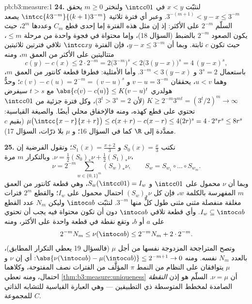 \begin{solution}{pb:b3:measure:1}
\textbf{24.} لنثبّت $x < y$ في $\intcc01$ ولنختر $m \geq 0$
يحقق $3^{-(m+1)} < y - x \leq 3^{-m}$. وعبر أي فترة ثلاثية $\intcc{k3^{-m}}{(k+1)3^{-m}}$ يصعد السلّم $2^{-m}$
على الأكثر: إذ إن مثل هذه الفترة إما إحدى قطع $C_m$ وعددها
$2^m$، حيث يكون الصعود $2^{-m}$ بالضبط (السؤال 18)، وإما محتواة
في  فجوة واحدة من مرحلة $\leq m$، حيث تكون $c$ ثابتة. وبما
أن $y - x \leq
3^{-m}$، فإن الفترة $\intcc xy$ تلاقي فترتين ثلاثيتين
متتاليتين على الأكثر من العمق $m$، ومنه
\[
c(y) - c(x) \leq 2\cdot2^{-m}
= 2\bigl(3^{-m}\bigr)^{s}
< 2\bigl(3(y - x)\bigr)^{s}
= 4\,(y - x)^{s},
\]
باستعمال $3^{s} = 2$ و $3^{-m} < 3(y - x)$. وأما الأمثلية: فطرفا قطعة كانتور
من العمق $m$، وهما $u < v$، يحققان $v - u =
3^{-m}$ و $c(v) - c(u) = 2^{-m} = (v - u)^{s}$؛ وحدٌّ
هولدري $\abs{c(v) - c(u)} \leq K(v - u)^{t}$ مع $t > s$ سيفرض $K \geq 2^{-m}3^{mt} = (3^{t}/2)^{m} \to \infty$ (لأن $3^{t} > 3^{s} = 2$)، وكل فترة
جزئية من $\intcc01$ تحتوي على قطع كهذه، ومنه فالإخفاق محلي أيضًا.
والصيغة القياسية: $\mu\bigl(\intcc{x-r}{x+r}\bigr) \leq
c(x + r) - c(x - r) \leq 4(2r)^{s} = 4\cdot2^{s}r^{s} \leq
8r^{s}$ (بقيم $c$ ممدَّدة إلى $\R$ كما في
السؤال 16؛ و $\mu$ بلا ذرّات، السؤال 17).

\textbf{25.} نكتب $S_0(x) = \frac x3$ و $S_1(x) =
\frac{x+2}3$؛ وتقول الفرضية إن $\nu = \frac12(S_0)_*\nu +
\frac12(S_1)_*\nu$.
وبالتكرار $m$ مرة،
\[
\nu = 2^{-m}\sum_{w \in \{0,1\}^m}(S_w)_*\nu,
\qquad S_w = S_{w_1}\circ\dots\circ S_{w_m}.
\]
وبما أن $\nu$ محمول على $\intcc01$ و $S_w(\intcc01) =
I_w$، وهي قطعة كانتور
من العمق $m$ المفهرسة بالكلمة $w$، فإن كل $(S_w)_*\nu$  احتمال
محمول على $I_w$؛ والقطع $2^m$ فترات مغلقة منفصلة مثنى مثنى
طول كلٍّ منها $3^{-m}$. لنثبّت $\intoc ab$ وليكن $N_m$ عدد القطع
$I_w \subseteq \intoc ab$. وأي قطعة تلاقي $\intoc ab$ دون أن تكون محتواة فيه يجب
أن تحتوي على $a$ أو $b$، وتقع نقطة في قطعة واحدة على الأكثر،
ومنه
\[
2^{-m}N_m \leq \nu(\intoc ab) \leq 2^{-m}N_m + 2\cdot2^{-m}.
\]
وتصح المتراجحة المزدوجة نفسها من أجل $\mu$ (فالسؤال 19 يعطي
التكرار المطابق)، بالعدد $N_m$ نفسه. ومنه $\abs{\nu(\intoc ab) - \mu(\intoc ab)} \leq 2^{-m+1} \to 0$: أي إن $\nu$
و $\mu$ يتوافقان على النظام من النمط $\pi$ المؤلَّف من الفترات
نصف المفتوحة، وكلاهما  احتمال، ومنه تعطي \cref{thm:b3:measure:uniqueness} أن
$\nu = \mu$.  السلّم هو إذن \emph{النقطة} الصامدة لمخطط
المتوسطة ذي التطبيقين --- وهي العبارة القياسية للتشابه الذاتي
للمجموعة $C$.
\end{solution}
